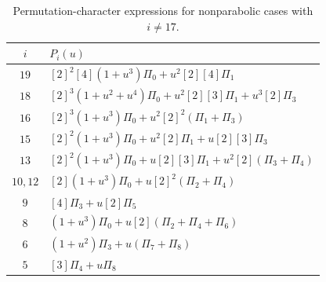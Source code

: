 \documentclass[11pt]{amsart}
\numberwithin{equation}{section}
\theoremstyle{definition}
\begin{document}
\begin{table}[htbp]
\centering
\renewcommand{\arraystretch}{1.2}
\begin{tabular}{@{}cl@{}}
\toprule
$i$&$P_i(u)$\\
\midrule
$19$&$[2]^2[4](1+u^3)\Pi_0+u^2[2][4]\Pi_1$\\
$18$&$[2]^3(1+u^2+u^4)\Pi_0
       +u^2[2][3]\Pi_1+u^3[2]\Pi_3$\\
$16$&$[2]^3(1+u^3)\Pi_0+u^2[2]^2(\Pi_1+\Pi_3)$\\
$15$&$[2]^2(1+u^3)\Pi_0+u^2[2]\Pi_1+u[2][3]\Pi_3$\\
$13$&$[2]^2(1+u^3)\Pi_0
       +u[2][3]\Pi_1+u^2[2](\Pi_3+\Pi_4)$\\
$10,12$&$[2](1+u^3)\Pi_0+u[2]^2(\Pi_2+\Pi_4)$\\
$9$&$[4]\Pi_3+u[2]\Pi_5$\\
$8$&$(1+u^3)\Pi_0+u[2](\Pi_2+\Pi_4+\Pi_6)$\\
$6$&$(1+u^2)\Pi_3+u(\Pi_7+\Pi_8)$\\
$5$&$[3]\Pi_4+u\Pi_8$\\
\bottomrule
\end{tabular}
\par
\vspace{8pt}
\caption{Permutation-character expressions for nonparabolic
cases with $i\neq 17$.}
\label{tab:C3.permutation}
\end{table}
\end{document}
